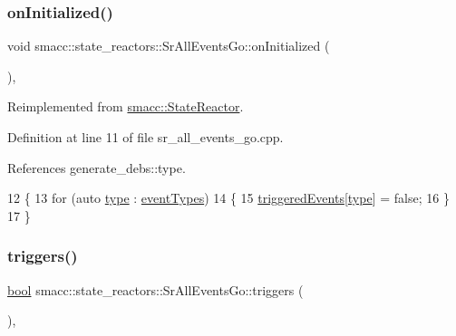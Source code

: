 \subsubsection{\texorpdfstring{on\+Initialized()}{onInitialized()}}
{\footnotesize\ttfamily void smacc\+::state\+\_\+reactors\+::\+Sr\+All\+Events\+Go\+::on\+Initialized (\begin{DoxyParamCaption}{ }\end{DoxyParamCaption})\hspace{0.3cm}{\ttfamily [override]}, {\ttfamily [virtual]}}



Reimplemented from \hyperlink{classsmacc_1_1StateReactor_aa10b2c6b7d1e80f01b00cbdac526a2bf}{smacc\+::\+State\+Reactor}.



Definition at line 11 of file sr\+\_\+all\+\_\+events\+\_\+go.\+cpp.



References generate\+\_\+debs\+::type.


\begin{DoxyCode}
12 \{
13     \textcolor{keywordflow}{for} (\textcolor{keyword}{auto} \hyperlink{namespacegenerate__debs_a50bc9a7ecac9584553e089a448bcde58}{type} : \hyperlink{classsmacc_1_1StateReactor_a65c8ddfce40e7859e5c73fff1cf6c04b}{eventTypes})
14     \{
15         \hyperlink{classsmacc_1_1state__reactors_1_1SrAllEventsGo_a2c3d7c7e15ed155ae6e83fe49e7897e9}{triggeredEvents}[\hyperlink{namespacegenerate__debs_a50bc9a7ecac9584553e089a448bcde58}{type}] = \textcolor{keyword}{false};
16     \}
17 \}
\end{DoxyCode}
\mbox{\label{classsmacc_1_1state__reactors_1_1SrAllEventsGo_ab752043eda070661d2a676b580c679b7}} 
\subsubsection{\texorpdfstring{triggers()}{triggers()}}
{\footnotesize\ttfamily \hyperlink{classbool}{bool} smacc\+::state\+\_\+reactors\+::\+Sr\+All\+Events\+Go\+::triggers (\begin{DoxyParamCaption}{ }\end{DoxyParamCaption})\hspace{0.3cm}{\ttfamily [override]}, {\ttfamily [virtual]}}



